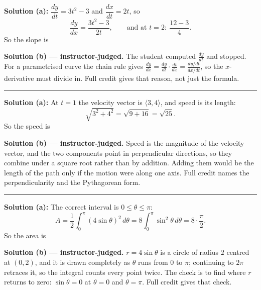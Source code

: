 \documentclass[12pt]{article}
\begin{document}



\textbf{Solution (a):} $\dfrac{dy}{dt} = 3t^2 - 3$ and $\dfrac{dx}{dt} = 2t$, so
\[ \frac{dy}{dx} = \frac{3t^2 - 3}{2t}, \qquad\text{and at } t = 2: \ \frac{12 - 3}{4}. \]
So the slope is 

\textbf{Solution (b) --- instructor-judged.} The student computed $\frac{dy}{dt}$ and stopped. For a parametrised curve the chain rule gives $\frac{dy}{dx} = \frac{dy}{dt}\cdot\frac{dt}{dx} = \frac{dy/dt}{dx/dt}$, so the $x$-derivative must divide in. Full credit gives that reason, not just the formula.

\vspace{0.2cm}\noindent\rule{\linewidth}{0.2pt}\vspace{0.2cm}


\textbf{Solution (a):} At $t = 1$ the velocity vector is $\langle 3, 4\rangle$, and speed is its length:
\[ \sqrt{3^2 + 4^2} = \sqrt{9 + 16} = \sqrt{25}. \]
So the speed is 

\textbf{Solution (b) --- instructor-judged.} Speed is the magnitude of the velocity vector, and the two components point in perpendicular directions, so they combine under a square root rather than by addition. Adding them would be the length of the path only if the motion were along one axis. Full credit names the perpendicularity and the Pythagorean form.

\vspace{0.2cm}\noindent\rule{\linewidth}{0.2pt}\vspace{0.2cm}


\textbf{Solution (a):} The correct interval is $0 \le \theta \le \pi$:
\[ A = \frac{1}{2}\int_0^{\pi} (4\sin\theta)^2\,d\theta = 8\int_0^{\pi}\sin^2\theta\,d\theta = 8\cdot\frac{\pi}{2}. \]
So the area is 

\textbf{Solution (b) --- instructor-judged.} $r = 4\sin\theta$ is a circle of radius $2$ centred at $(0,2)$, and it is drawn completely as $\theta$ runs from $0$ to $\pi$; continuing to $2\pi$ retraces it, so the integral counts every point twice. The check is to find where $r$ returns to zero: $\sin\theta = 0$ at $\theta = 0$ and $\theta = \pi$. Full credit gives that check.
\end{document}
